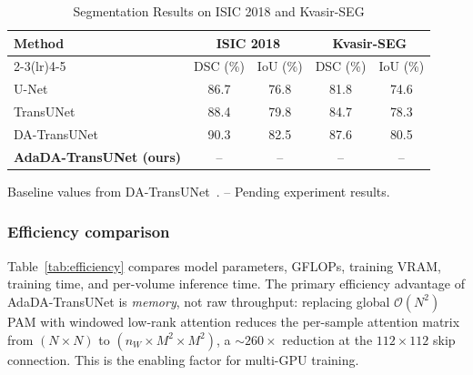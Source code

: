 \documentclass[conference]{IEEEtran}
\begin{document}
\begin{table}[t]
  \caption{Segmentation Results on ISIC 2018 and Kvasir-SEG}
  \label{tab:other_datasets}
  \begin{center}
  \setlength{\tabcolsep}{4pt}
  \begin{tabular}{lcccc}
    \toprule
    \multirow{2}{*}{Method} & \multicolumn{2}{c}{ISIC 2018} & \multicolumn{2}{c}{Kvasir-SEG} \\
    \cmidrule(lr){2-3}\cmidrule(lr){4-5}
    & DSC (\%) & IoU (\%) & DSC (\%) & IoU (\%) \\
    \midrule
    U-Net~\cite{ronneberger2015unet}            & 86.7 & 76.8 & 81.8 & 74.6 \\
    TransUNet~\cite{chen2021transunet}           & 88.4 & 79.8 & 84.7 & 78.3 \\
    DA-TransUNet~\cite{sun2024datransunet}       & 90.3 & 82.5 & 87.6 & 80.5 \\
    \midrule
    \textbf{AdaDA-TransUNet (ours)}             & --   & --   & --   & -- \\
    \bottomrule
  \end{tabular}
  \end{center}
  \vspace{-0.4em}
  \footnotesize{Baseline values from DA-TransUNet~\cite{sun2024datransunet}. -- Pending experiment results.}
\end{table}

\subsubsection{Efficiency comparison}
Table~\ref{tab:efficiency} compares model parameters, GFLOPs, training VRAM, training time, and per-volume inference time. The primary efficiency advantage of AdaDA-TransUNet is \emph{memory}, not raw throughput: replacing global $\mathcal{O}(N^2)$ PAM with windowed low-rank attention reduces the per-sample attention matrix from $(N\!\times\!N)$ to $(n_W\!\times\!M^2\!\times\!M^2)$, a ${\sim}260\times$ reduction at the $112\!\times\!112$ skip connection. This is the enabling factor for multi-GPU training.
\end{document}
